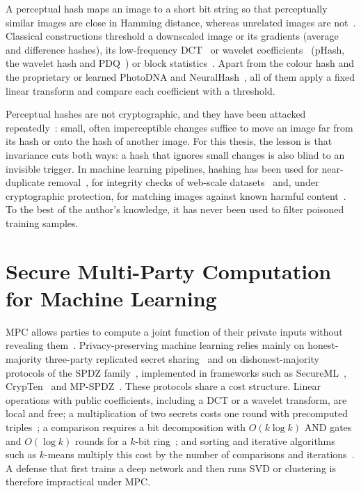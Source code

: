 A perceptual hash maps an image to a short bit string so that perceptually
similar images are close in Hamming distance, whereas unrelated images are
not~\cite{venkatesan2000robust,monga2006perceptual,zauner2010phash,farid2021overview}.
Classical constructions threshold a downscaled image or its gradients (average
and difference hashes), its low-frequency DCT~\cite{ahmed1974dct} or wavelet
coefficients~\cite{mallat1989wavelet} (pHash, the wavelet hash and
PDQ~\cite{meta2019pdq}) or block statistics~\cite{yang2006blockmean}. Apart
from the colour hash and the proprietary or learned PhotoDNA and
NeuralHash~\cite{apple2021neuralhash}, all of them apply a fixed linear transform
and compare each coefficient with a threshold.

Perceptual hashes are not cryptographic, and they have been attacked
repeatedly~\cite{hao2021notwhat,struppek2022neuralhash,jain2022adversarial,prokos2023squint}:
small, often imperceptible changes suffice to move an image far from its hash or
onto the hash of another image. For this thesis, the lesson is that invariance
cuts both ways: a hash that ignores small changes is also blind to an invisible
trigger. In machine learning pipelines, hashing has been used for
near-duplicate removal~\cite{barz2020cifair}, for integrity checks of web-scale
datasets~\cite{carlini2024webscale} and, under cryptographic protection, for
matching images against known harmful content~\cite{kulshrestha2021identifying}.
To the best of the author's knowledge, it has never been used to filter poisoned
training samples.

\section{Secure Multi-Party Computation for Machine Learning}
\label{sec:lr-mpc}

MPC allows parties to compute a joint function of their private inputs without
revealing them~\cite{yao1986generate,goldreich1987play,benor1988completeness}.
Privacy-preserving machine learning relies mainly on honest-majority
three-party replicated secret sharing~\cite{araki2016highthroughput,mohassel2018aby3,wagh2021falcon}
and on dishonest-majority protocols of the SPDZ
family~\cite{damgard2012spdz,cramer2018spdz2k}, implemented in frameworks such as
SecureML~\cite{mohassel2017secureml}, CrypTen~\cite{knott2021crypten} and
MP-SPDZ~\cite{keller2020mpspdz}. These protocols share a cost structure. Linear
operations with public coefficients, including a DCT or a wavelet transform,
are local and free; a multiplication of two secrets costs one round with
precomputed triples~\cite{beaver1991efficient}; a comparison requires a bit
decomposition with $O(k\log k)$ AND gates and $O(\log k)$ rounds for a $k$-bit
ring~\cite{catrina2010primitives,escudero2020edabits}; and sorting and iterative
algorithms such as $k$-means multiply this cost by the number of comparisons and
iterations~\cite{batcher1968sorting,mohassel2020kmeans}. A defense that first
trains a deep network and then runs SVD or clustering is therefore impractical
under MPC.

